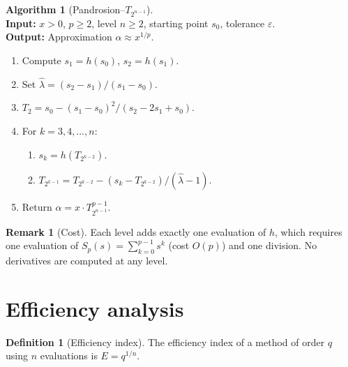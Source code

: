 \documentclass[11pt,a4paper]{article}
\theoremstyle{definition}
\newtheorem{definition}{Definition}[section]
\newtheorem{remark}{Remark}[section]
\newtheorem{algorithm_def}{Algorithm}[section]
\newcommand{\eps}{\varepsilon}
\begin{document}
\begin{algorithm_def}[Pandrosion--$T_{2^{n-1}}$]
\label{alg:full}
\mbox{}\\
\textbf{Input:} $x > 0$, $p \geq 2$, level $n \geq 2$, starting point $s_0$, tolerance $\eps$. \\
\textbf{Output:} Approximation $\alpha \approx x^{1/p}$.
\begin{enumerate}
  \item Compute $s_1 = h(s_0)$, $s_2 = h(s_1)$.
  \item Set $\hat\lambda = (s_2 - s_1)/(s_1 - s_0)$.
  \item $T_2 = s_0 - (s_1 - s_0)^2/(s_2 - 2s_1 + s_0)$.
  \item For $k = 3, 4, \ldots, n$:
  \begin{enumerate}
    \item $s_k = h(T_{2^{k-2}})$.
    \item $T_{2^{k-1}} = T_{2^{k-2}} - (s_k - T_{2^{k-2}})/(\hat\lambda - 1)$.
  \end{enumerate}
  \item Return $\alpha = x \cdot T_{2^{n-1}}^{p-1}$.
\end{enumerate}
\end{algorithm_def}

\begin{remark}[Cost]
Each level adds exactly one evaluation of $h$, which requires one evaluation of $S_p(s) = \sum_{k=0}^{p-1} s^k$ (cost $O(p)$) and one division.  No derivatives are computed at any level.
\end{remark}

\section{Efficiency analysis}
\label{sec:efficiency}

\begin{definition}[Efficiency index]
The efficiency index of a method of order $q$ using $n$ evaluations is $E = q^{1/n}$.
\end{definition}
\end{document}
